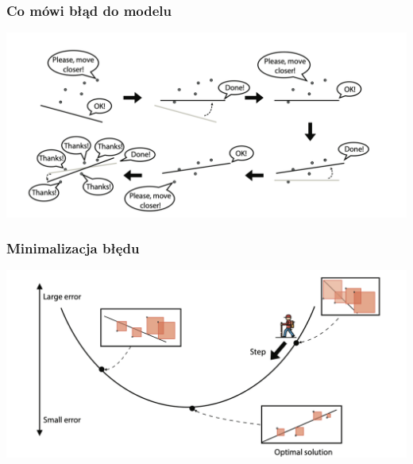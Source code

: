 \documentclass[smaller]{beamer}
\begin{document}

\begin{frame}
\frametitle{Co mówi błąd do modelu}
    \centering
    \includegraphics[width=\textwidth,height=0.8\textheight,keepaspectratio]{../manifest/points-move.png}
\end{frame}


\begin{frame}
\frametitle{Minimalizacja błędu}
    \centering
    \includegraphics[width=\textwidth,height=0.8\textheight,keepaspectratio]{../manifest/error-optim.png}
\end{frame}


\end{document}
